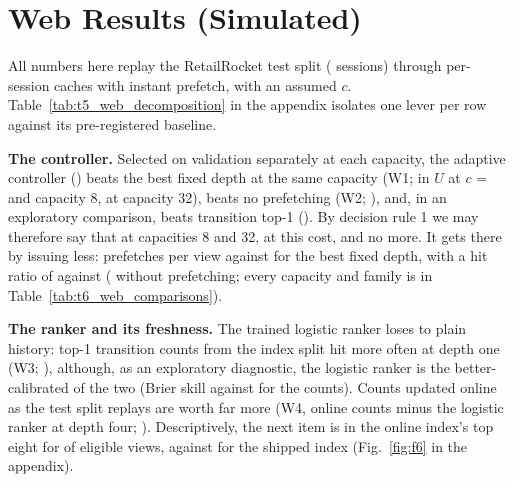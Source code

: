 
\section{Web Results (Simulated)}\label{sec:web}

All numbers here replay the RetailRocket test split (\webSessions{} sessions)
through per-session caches with instant prefetch, with an assumed $c$.
Table~\ref{tab:t5_web_decomposition} in the appendix isolates one lever per
row against its pre-registered baseline.

\textbf{The controller.} Selected on validation separately at each capacity,
the adaptive controller (\polAdaptive) beats the best fixed depth at the same
capacity (W1; \decWebWOneCapEightCI{} in $U$ at $c$ = \webHeadlineCost{} and
capacity 8, \decWebWOneCapThirtyTwoCI{} at capacity 32), beats no prefetching
(W2; \decWebWTwoCapEightCI), and, in an exploratory comparison, beats
transition top-1 (\webCmpVsTransitionPerCapacityLogisticCapEightCostZeroPointZeroOneCI). By
decision rule 1 we may therefore say that \decWebRuleOneCapEightVerdict{} at
capacities 8 and 32, at this cost, and no more. It gets there by issuing less:
\webIssuedLogisticCapEightAdaptiveZeroPointZeroOne{} prefetches per view
against \webIssuedLogisticCapEightFixedOne{} for the best fixed depth, with a
hit ratio of \webHitLogisticCapEightAdaptiveZeroPointZeroOne{} against
\webHitLogisticCapEightFixedOne{} (\webHitLogisticCapEightFixedZero{} without
prefetching; every capacity and family is in Table~\ref{tab:t6_web_comparisons}).

\textbf{The ranker and its freshness.} The trained logistic ranker loses to
plain history: top-1 transition counts from the index split hit more often at
depth one (W3; \decWebWThreeHitRankerCI), although, as an
exploratory diagnostic, the logistic ranker is the better-calibrated of the
two (Brier skill \webBrierSkillLogistic{} against \webBrierSkillTransSZero{}
for the counts).
Counts updated online as the test split replays are worth far more (W4,
online counts minus the logistic ranker at depth four;
\decWebWFourHitFreshnessCI). Descriptively, the next item is in the online
index's top eight for \webCoverageOnlineKEight{} of eligible views, against
\webCoverageSplitZeroKEight{} for the shipped index (Fig.~\ref{fig:f6} in the
appendix).

